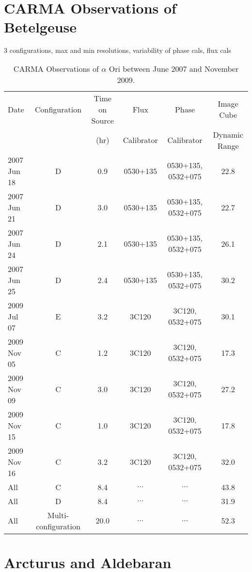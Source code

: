 \section{CARMA Observations of Betelgeuse}\label{sec:3.3}
3 configurations, max and min resolutions, variability of phase cals, flux cals
\begin{landscape}
\begin{table}
\begin{center}
\caption[CARMA Observations of $\alpha$ Ori.]
{CARMA Observations of $\alpha$ Ori between June 2007 and November 2009.}
\begin{tabular}{lccccc}
\hline
\hline
\rule{0pt}{2.5ex}Date & Configuration & Time on Source & Flux		& Phase 	& Image Cube \\
	 & 				 &  (hr)		  & Calibrator	& Calibrator& Dynamic Range \\
\hline
\rule{0pt}{2.5ex}2007 Jun 18 	& D & 0.9 & 0530+135	& 0530+135, 0532+075 	&  22.8 \\
2007 Jun 21 	& D & 3.0 & 0530+135	& 0530+135, 0532+075 	&  22.7 \\
2007 Jun 24 	& D & 2.1 & 0530+135	& 0530+135, 0532+075 	&  26.1 \\
2007 Jun 25 	& D & 2.4 & 0530+135	& 0530+135, 0532+075 	&  30.2 \\
2009 Jul 07	& E & 3.2 & 3C120 		& 3C120, 0532+075	& 30.1 \\
2009 Nov 05	& C & 1.2 & 3C120 		& 3C120, 0532+075 	& 17.3 \\
2009 Nov 09 	& C & 3.0 & 3C120 		& 3C120, 0532+075 	& 27.2 \\
2009 Nov 15	& C & 1.0 & 3C120 		& 3C120, 0532+075 	& 17.8 \\
2009 Nov 16	& C & 3.2 & 3C120 		& 3C120, 0532+075 	& 32.0  \\
All		& C & 8.4	&  $\dots$	& 	$\dots$	& 43.8 \\
All 		& D & 8.4 &  $\dots$	&  	$\dots$	& 31.9 \\
All 		& Multi-configuration & 20.0 & $\dots$& $\dots$ 	& 52.3 \\
\hline
\end{tabular}
\label{tab:1}
\end{center}
\end{table}
\end{landscape}

\section{Arcturus and Aldebaran}\label{sec:3.4}

